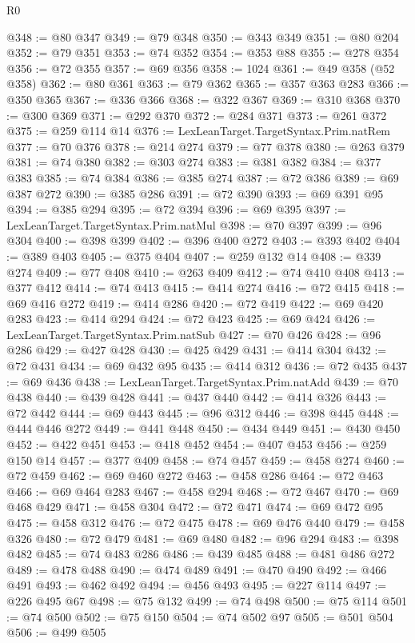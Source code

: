\begin{lexlean}{R0}
\begin{coremodule}
@348 := @80 @347
@349 := @79 @348
@350 := @343 @349
@351 := @80 @204
@352 := @79 @351
@353 := @74 @352
@354 := @353 @88
@355 := @278 @354
@356 := @72 @355
@357 := @69 @356
@358 := 1024
@361 := @49 @358 (@52 @358)
@362 := @80 @361
@363 := @79 @362
@365 := @357 @363 @283
@366 := @350 @365
@367 := @336 @366
@368 := @322 @367
@369 := @310 @368
@370 := @300 @369
@371 := @292 @370
@372 := @284 @371
@373 := @261 @372
@375 := @259 @114 @14
@376 := LexLeanTarget.TargetSyntax.Prim.natRem
@377 := @70 @376
@378 := @214 @274
@379 := @77 @378
@380 := @263 @379
@381 := @74 @380
@382 := @303 @274
@383 := @381 @382
@384 := @377 @383
@385 := @74 @384
@386 := @385 @274
@387 := @72 @386
@389 := @69 @387 @272
@390 := @385 @286
@391 := @72 @390
@393 := @69 @391 @95
@394 := @385 @294
@395 := @72 @394
@396 := @69 @395
@397 := LexLeanTarget.TargetSyntax.Prim.natMul
@398 := @70 @397
@399 := @96 @304
@400 := @398 @399
@402 := @396 @400 @272
@403 := @393 @402
@404 := @389 @403
@405 := @375 @404
@407 := @259 @132 @14
@408 := @339 @274
@409 := @77 @408
@410 := @263 @409
@412 := @74 @410 @408
@413 := @377 @412
@414 := @74 @413
@415 := @414 @274
@416 := @72 @415
@418 := @69 @416 @272
@419 := @414 @286
@420 := @72 @419
@422 := @69 @420 @283
@423 := @414 @294
@424 := @72 @423
@425 := @69 @424
@426 := LexLeanTarget.TargetSyntax.Prim.natSub
@427 := @70 @426
@428 := @96 @286
@429 := @427 @428
@430 := @425 @429
@431 := @414 @304
@432 := @72 @431
@434 := @69 @432 @95
@435 := @414 @312
@436 := @72 @435
@437 := @69 @436
@438 := LexLeanTarget.TargetSyntax.Prim.natAdd
@439 := @70 @438
@440 := @439 @428
@441 := @437 @440
@442 := @414 @326
@443 := @72 @442
@444 := @69 @443
@445 := @96 @312
@446 := @398 @445
@448 := @444 @446 @272
@449 := @441 @448
@450 := @434 @449
@451 := @430 @450
@452 := @422 @451
@453 := @418 @452
@454 := @407 @453
@456 := @259 @150 @14
@457 := @377 @409
@458 := @74 @457
@459 := @458 @274
@460 := @72 @459
@462 := @69 @460 @272
@463 := @458 @286
@464 := @72 @463
@466 := @69 @464 @283
@467 := @458 @294
@468 := @72 @467
@470 := @69 @468 @429
@471 := @458 @304
@472 := @72 @471
@474 := @69 @472 @95
@475 := @458 @312
@476 := @72 @475
@478 := @69 @476 @440
@479 := @458 @326
@480 := @72 @479
@481 := @69 @480
@482 := @96 @294
@483 := @398 @482
@485 := @74 @483 @286
@486 := @439 @485
@488 := @481 @486 @272
@489 := @478 @488
@490 := @474 @489
@491 := @470 @490
@492 := @466 @491
@493 := @462 @492
@494 := @456 @493
@495 := @227 @114
@497 := @226 @495 @67
@498 := @75 @132
@499 := @74 @498
@500 := @75 @114
@501 := @74 @500
@502 := @75 @150
@504 := @74 @502 @97
@505 := @501 @504
@506 := @499 @505

\end{coremodule}
\end{lexlean}
